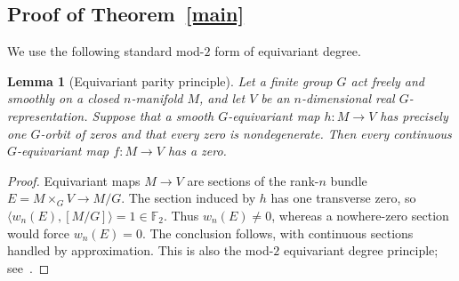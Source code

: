 \documentclass[12pt]{article}
\newtheorem{lemma}[thm]{Lemma}
\begin{document}
\subsection{Proof of Theorem~\ref{main}}\label{sec:proof-main}

We use the following standard mod-$2$ form of equivariant degree.

\begin{lemma}[Equivariant parity principle]\label{lem:degree}
Let a finite group $G$ act freely and smoothly on a closed
$n$-manifold $M$, and let $V$ be an $n$-dimensional real
$G$-representation.  Suppose that a smooth $G$-equivariant map
$h:M\to V$ has precisely one $G$-orbit of zeros and that every zero
is nondegenerate.  Then every continuous $G$-equivariant map
$f:M\to V$ has a zero.
\end{lemma}

\begin{proof}
Equivariant maps $M\to V$ are sections of the rank-$n$ bundle
$E=M\times_GV\to M/G$.  The section induced by $h$ has one transverse
zero, so
$\langle w_n(E),[M/G]\rangle=1\in\mathbb F_2$.
Thus $w_n(E)\ne0$, whereas a nowhere-zero section would force
$w_n(E)=0$.  The conclusion follows, with continuous sections handled
by approximation.  This is also the mod-$2$ equivariant degree
principle; see~\cite[Theorem~1]{Mus12}.
\end{proof}
\end{document}
